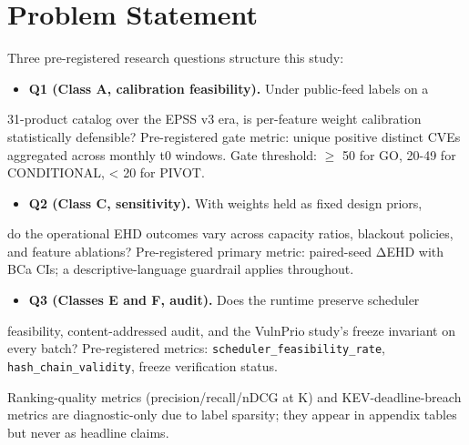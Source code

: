 \section{Problem Statement}
Three pre-registered research questions structure this study:

\begin{itemize}
\item \textbf{Q1 (Class A, calibration feasibility).} Under public-feed labels on a
\end{itemize}

31-product catalog over the EPSS v3 era, is per-feature weight calibration statistically defensible? Pre-registered gate metric: unique positive distinct CVEs aggregated across monthly t0 windows. Gate threshold: $\geq$ 50 for GO, 20-49 for CONDITIONAL, < 20 for PIVOT.

\begin{itemize}
\item \textbf{Q2 (Class C, sensitivity).} With weights held as fixed design priors,
\end{itemize}

do the operational EHD outcomes vary across capacity ratios, blackout policies, and feature ablations? Pre-registered primary metric: paired-seed ΔEHD with BCa CIs; a descriptive-language guardrail applies throughout.

\begin{itemize}
\item \textbf{Q3 (Classes E and F, audit).} Does the runtime preserve scheduler
\end{itemize}

feasibility, content-addressed audit, and the VulnPrio study's freeze invariant on every batch? Pre-registered metrics: \texttt{scheduler\_feasibility\_rate}, \texttt{hash\_chain\_validity}, freeze verification status.

Ranking-quality metrics (precision/recall/nDCG at K) and KEV-deadline-breach metrics are diagnostic-only due to label sparsity; they appear in appendix tables but never as headline claims.
